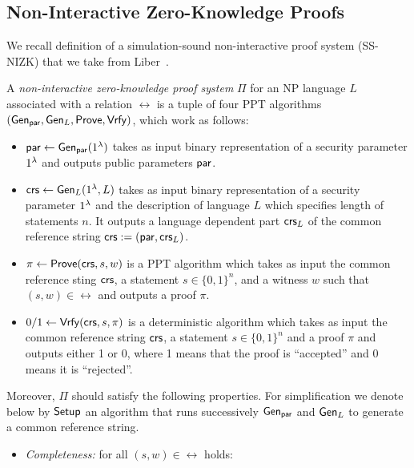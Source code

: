 
\subsection{Non-Interactive Zero-Knowledge Proofs}
We recall definition of a simulation-sound non-interactive proof system (SS-NIZK) that we take from Liber~\etal \cite{Libert2021OneShotFN}. 

\begin{definition} 
A \emph{non-interactive zero-knowledge proof system} $\Pi$ for an NP language $L$ associated with a relation $\rel$ is a tuple of four PPT algorithms $(\mathsf{Gen}_{\mathsf{par}}, \mathsf{Gen}_L, \mathsf{Prove}, \mathsf{Vrfy})$, which work as follows:
\begin{itemize}
\item $\mathsf{par} \leftarrow \mathsf{Gen}_{\mathsf{par}}(1{^{\lambda}})$ takes as input binary representation of a security parameter $1{^{\lambda}}$ and outputs public parameters $\mathsf{par}$.
\item $\mathsf{crs} \leftarrow \mathsf{Gen}_L(1{^{\lambda}}, L)$ takes as input binary representation of a security parameter $1{^{\lambda}}$ and the description of language $L$ which specifies length of statements $n$.  It outputs a language dependent part $\mathsf{crs}_L$ of the common reference string $\mathsf{crs}:=(\mathsf{par}, \mathsf{crs}_L)$. 
\item $\pi \leftarrow \mathsf{Prove}(\mathsf{crs},s,w)$ is a PPT algorithm which takes as input the common reference sting $\mathsf{crs}$, a statement $s \in \{0,1\}^n$, and a witness $w$ such that $(s,w) \in \rel$ and outputs a proof $\pi$.
\item $0/1 \leftarrow \mathsf{Vrfy}(\mathsf{crs}, s, \pi)$ is a deterministic algorithm which takes as input the common reference string $\mathsf{crs}$, a statement $s\in \{0,1\}^n$ and a proof $\pi$ and outputs either 1 or 0, where 1 means that the proof is ``accepted'' and 0 means it is ``rejected''.
\end{itemize}
Moreover, $\Pi$ should satisfy the following properties. For simplification we denote below by $\mathsf{Setup}$ an algorithm that runs successively $\mathsf{Gen}_{\mathsf{par}}$ and $\mathsf{Gen}_L$ to generate a common reference string. 
\begin{itemize}
\item \emph{Completeness:}  for all $(s, w) \in \rel$ holds:

\end{itemize}
\end{definition}
